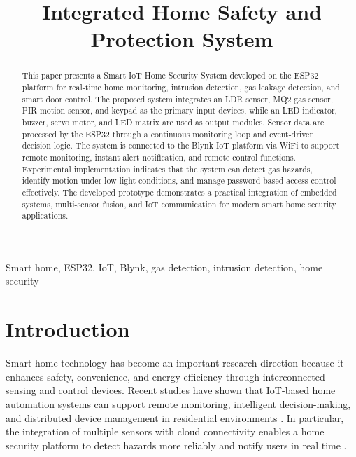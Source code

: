 \documentclass[conference]{IEEEtran}
\begin{document}
\title{Integrated Home Safety and Protection System\textbf{}}

\author{
}

\maketitle

\begin{abstract}
This paper presents a Smart IoT Home Security System developed on the ESP32 platform for real-time home monitoring, intrusion detection, gas leakage detection, and smart door control. The proposed system integrates an LDR sensor, MQ2 gas sensor, PIR motion sensor, and keypad as the primary input devices, while an LED indicator, buzzer, servo motor, and LED matrix are used as output modules. Sensor data are processed by the ESP32 through a continuous monitoring loop and event-driven decision logic. The system is connected to the Blynk IoT platform via WiFi to support remote monitoring, instant alert notification, and remote control functions. Experimental implementation indicates that the system can detect gas hazards, identify motion under low-light conditions, and manage password-based access control effectively. The developed prototype demonstrates a practical integration of embedded systems, multi-sensor fusion, and IoT communication for modern smart home security applications.
\end{abstract}

\begin{IEEEkeywords}
Smart home, ESP32, IoT, Blynk, gas detection, intrusion detection, home security
\end{IEEEkeywords}

\section{Introduction}
Smart home technology has become an important research direction because it enhances safety, convenience, and energy efficiency through interconnected sensing and control devices. Recent studies have shown that IoT-based home automation systems can support remote monitoring, intelligent decision-making, and distributed device management in residential environments \cite{malche2017internet,stojkoska2017review,gunawan2017prototype}. In particular, the integration of multiple sensors with cloud connectivity enables a home security platform to detect hazards more reliably and notify users in real time \cite{taiwo2021internet,al2020smart,iqbal2018interoperable}.
\end{document}
